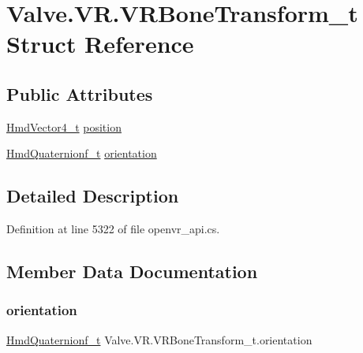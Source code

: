 \hypertarget{struct_valve_1_1_v_r_1_1_v_r_bone_transform__t}{}\section{Valve.\+V\+R.\+V\+R\+Bone\+Transform\+\_\+t Struct Reference}
\label{struct_valve_1_1_v_r_1_1_v_r_bone_transform__t}
\subsection*{Public Attributes}
\begin{DoxyCompactItemize}
\item 
\mbox{\hyperlink{struct_valve_1_1_v_r_1_1_hmd_vector4__t}{Hmd\+Vector4\+\_\+t}} \mbox{\hyperlink{struct_valve_1_1_v_r_1_1_v_r_bone_transform__t_afeca40634db5d8576d54ff5795f829ca}{position}}
\item 
\mbox{\hyperlink{struct_valve_1_1_v_r_1_1_hmd_quaternionf__t}{Hmd\+Quaternionf\+\_\+t}} \mbox{\hyperlink{struct_valve_1_1_v_r_1_1_v_r_bone_transform__t_a91b9128447979a2a84eb5f05d36cacdf}{orientation}}
\end{DoxyCompactItemize}


\subsection{Detailed Description}


Definition at line 5322 of file openvr\+\_\+api.\+cs.



\subsection{Member Data Documentation}
\mbox{\label{struct_valve_1_1_v_r_1_1_v_r_bone_transform__t_a91b9128447979a2a84eb5f05d36cacdf}} 
\subsubsection{\texorpdfstring{orientation}{orientation}}
{\footnotesize\ttfamily \mbox{\hyperlink{struct_valve_1_1_v_r_1_1_hmd_quaternionf__t}{Hmd\+Quaternionf\+\_\+t}} Valve.\+V\+R.\+V\+R\+Bone\+Transform\+\_\+t.\+orientation}



